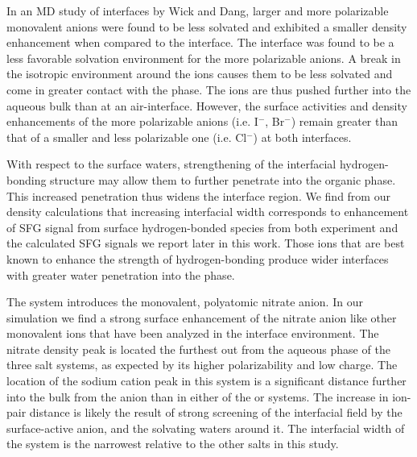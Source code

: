 In an MD study of \ctcwat interfaces by Wick and Dang,\cite{Wick2007a} larger and more polarizable monovalent anions were found to be less solvated and exhibited a smaller density enhancement when compared to the \airwat interface. The \ctcwat interface was found to be a less favorable solvation environment for the more polarizable anions. A break in the isotropic environment around the ions causes them to be less solvated and come in greater contact with the \ctc phase. The ions are thus pushed further into the aqueous bulk than at an air-interface. However, the surface activities and density enhancements of the more polarizable anions (i.e. I$^-$, Br$^-$) remain greater than that of a smaller and less polarizable one (i.e. Cl$^-$) at both interfaces. 

With respect to the surface waters, strengthening of the interfacial hydrogen-bonding structure may allow them to further penetrate into the organic phase. This increased penetration thus widens the interface region. We find from our density calculations that increasing interfacial width corresponds to enhancement of SFG signal from surface hydrogen-bonded species from both experiment\cite{McFearin2009} and the calculated SFG signals we report later in this work. Those ions that are best known to enhance the strength of hydrogen-bonding produce wider interfaces with greater water penetration into the \ctc phase.

The \sodnit system introduces the monovalent, polyatomic nitrate anion. In our simulation we find a strong surface enhancement of the nitrate anion like other monovalent ions that have been analyzed in the \ctcwat interface environment.\cite{Wick2007a} The nitrate density peak is located the furthest out from the aqueous phase of the three salt systems, as expected by its higher polarizability and low charge. The location of the sodium cation peak in this system is a significant distance further into the bulk from the anion than in either of the \nacl or \sodsul systems. The increase in ion-pair distance is likely the result of strong screening of the interfacial field by the surface-active anion, and the solvating waters around it. The interfacial width of the \sodnit system is the narrowest relative to the other salts in this study. 


